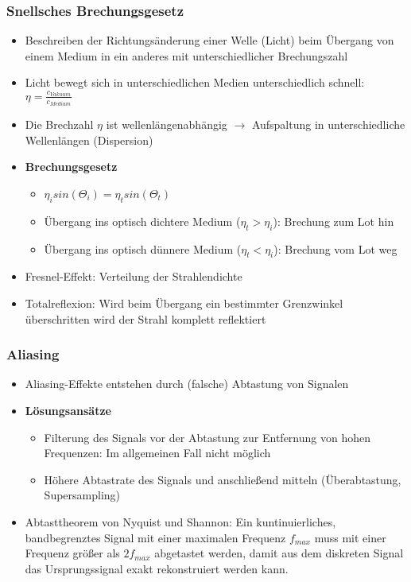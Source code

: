 \subsubsection{Snellsches Brechungsgesetz}
\begin{itemize}
	\item Beschreiben der Richtungsänderung einer Welle (Licht) beim Übergang von einem Medium in ein anderes mit unterschiedlicher Brechungszahl
	\item Licht bewegt sich in unterschiedlichen Medien unterschiedlich schnell: \(\eta = \frac{c_{Vakuum}}{c_{Medium}}\)
	\item Die Brechzahl \(\eta\) ist wellenlängenabhängig \(\rightarrow\) Aufspaltung in unterschiedliche Wellenlängen (Dispersion)
	\item \textbf{Brechungsgesetz}
	\begin{itemize}
		\item \(\eta_i sin(\Theta_i) = \eta_t sin(\Theta_t)\)
		\item Übergang ins optisch dichtere Medium (\(\eta_t > \eta_i\)): Brechung zum Lot hin
		\item Übergang ins optisch dünnere Medium (\(\eta_t < \eta_i\)): Brechung vom Lot weg
	\end{itemize}
	\item Fresnel-Effekt: Verteilung der Strahlendichte
	\item Totalreflexion: Wird beim Übergang ein bestimmter Grenzwinkel überschritten wird der Strahl komplett reflektiert
\end{itemize}

\subsubsection{Aliasing}
\begin{itemize}
	\item Aliasing-Effekte entstehen durch (falsche) Abtastung von Signalen
	\item \textbf{Lösungsansätze}
	\begin{itemize}
		\item Filterung des Signals vor der Abtastung zur Entfernung von hohen Frequenzen: Im allgemeinen Fall nicht möglich
		\item Höhere Abtastrate des Signals und anschließend mitteln (Überabtastung, Supersampling)
	\end{itemize}
	\item Abtasttheorem von Nyquist und Shannon: Ein kuntinuierliches, bandbegrenztes Signal mit einer maximalen Frequenz \(f_{max}\) muss mit einer Frequenz größer als \(2f_{max}\) abgetastet werden, damit aus dem diskreten Signal das Ursprungssignal exakt rekonstruiert werden kann.
\end{itemize}

